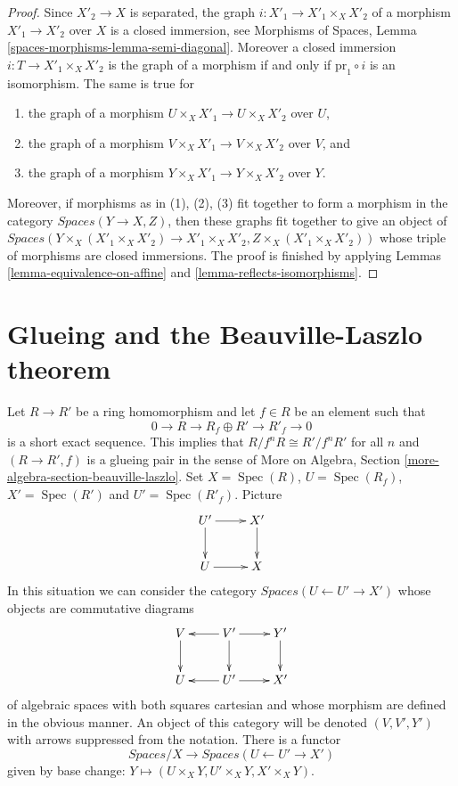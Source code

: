 \documentclass{stacks-project}
\theoremstyle{plain}
\theoremstyle{definition}
\theoremstyle{remark}
\numberwithin{equation}{subsection}
\def\Spec{\mathop{\mathrm{Spec}}}
\begin{document}
\begin{proof}
Since $X'_2 \to X$ is separated, the graph $i : X'_1 \to X'_1 \times_X X'_2$
of a morphism $X'_1 \to X'_2$ over $X$ is a closed immersion, see
Morphisms of Spaces, Lemma \ref{spaces-morphisms-lemma-semi-diagonal}.
Moreover a closed immersion $i : T \to X'_1 \times_X X'_2$ is the graph of a
morphism if and only if $\text{pr}_1 \circ i$ is an isomorphism.
The same is true for
\begin{enumerate}
\item the graph of a morphism $U \times_X X'_1 \to U \times_X X'_2$ over $U$,
\item the graph of a morphism $V \times_X X'_1 \to V \times_X X'_2$ over $V$,
and
\item the graph of a morphism $Y \times_X X'_1 \to Y \times_X X'_2$ over $Y$.
\end{enumerate}
Moreover, if morphisms as in (1), (2), (3) fit together to form a
morphism in the category $\textit{Spaces}(Y \to X, Z)$, then these
graphs fit together to give an object of
$\textit{Spaces}(Y \times_X (X'_1 \times_X X'_2) \to X'_1 \times_X X'_2,
Z \times_X (X'_1 \times_X X'_2))$
whose triple of morphisms are closed immersions. The proof is finished
by applying Lemmas \ref{lemma-equivalence-on-affine} and
\ref{lemma-reflects-isomorphisms}.
\end{proof}









\section{Glueing and the Beauville-Laszlo theorem}
\label{section-glueing-beauville-laszlo}

\noindent
Let $R \to R'$ be a ring homomorphism and let $f \in R$ be an element such that
$$
0 \to R \to R_f \oplus R' \to R'_f \to 0
$$
is a short exact sequence. This implies that $R/f^nR \cong R'/f^nR'$
for all $n$ and $(R \to R', f)$ is a glueing pair in the sense of
More on Algebra, Section \ref{more-algebra-section-beauville-laszlo}.
Set $X = \Spec(R)$, $U = \Spec(R_f)$, $X' = \Spec(R')$ and
$U' = \Spec(R'_f)$. Picture
$$
\xymatrix{
U' \ar[r] \ar[d] & X' \ar[d] \\
U \ar[r] & X
}
$$
In this situation we can consider the category
$\textit{Spaces}(U \leftarrow U' \to X')$ whose objects
are commutative diagrams
$$
\xymatrix{
V \ar[d] & V' \ar[l] \ar[d] \ar[r] & Y' \ar[d] \\
U & U' \ar[l] \ar[r] & X'
}
$$
of algebraic spaces with both squares cartesian and whose morphism
are defined in the obvious manner. An object of this category will
be denoted $(V, V', Y')$ with arrows suppressed from the notation.
There is a functor
\begin{equation}
\label{equation-beauville-laszlo-glueing-spaces}
\textit{Spaces}/X
\longrightarrow
\textit{Spaces}(U \leftarrow U' \to X')
\end{equation}
given by base change: $Y \mapsto (U \times_X Y, U' \times_X Y, X' \times_X Y)$.
\end{document}
